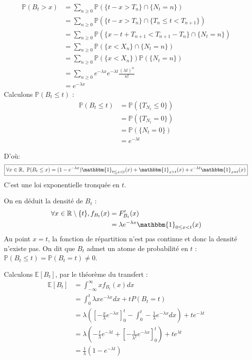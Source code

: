 \documentclass[a4paper, titlepage]{livret} %
\begin{document}
			\[\begin{aligned}
				\mathbb{P}(B_{t} > x) & = \sum_{n \geq 0} \mathbb{P}(\{t - x > T_{n}\} \cap \{N_{t} = n\})\\
									  & = \sum_{n \geq 0} \mathbb{P}(\{t - x > T_{n}\} \cap \{T_{n} \leq t < T_{n+1}\})\\
									  & = \sum_{n \geq 0} \mathbb{P}(\{x - t + T_{n+1} < T_{n+1} - T_{n}\} \cap \{N_{t} = n\})\\
									  & = \sum_{n \geq 0} \mathbb{P}(\{x < X_{n}\} \cap \{N_{t} = n\})\\
									  & = \sum_{n \geq 0} \mathbb{P}(\{x < X_{n}\}) \mathbb{P}(\{N_{t} = n\})\\
									  & = \sum_{n \geq 0} e^{-\lambda x}e^{-\lambda t}\frac{(\lambda t)^{n}}{n!}\\
									  & = e^{-\lambda x}
			\end{aligned}\]
			Calculons $\mathbb{P}(B_{t} \leq t)$ :
			\[\begin{aligned}
				\mathbb{P}(B_{t} \leq t) & = \mathbb{P}(\{T_{N_{t}} \leq 0\})\\
										 & = \mathbb{P}(\{T_{N_{t}} = 0\})\\
									     & = \mathbb{P}(\{N_{t} = 0\})\\
									     & = e^{-\lambda t}
			\end{aligned}\]

			D'où:
			\[\boxed{
				\forall x \in \mathbb{R}, \ \mathbb{P}(B_{t} \leq x) = (1 - e^{-\lambda x})\mathbbm{1}_{0 \leq x < t}(x) + \mathbbm{1}_{x > t}(x) + e^{-\lambda t}\mathbbm{1}_{x = t}(x)
			}\]
			C'est une loi exponentielle tronquée en $t$.

			On en déduit la densité de $B_{t}$ :
			\[\begin{aligned}
				\forall x \in \mathbb{R}\setminus \{t\}, f_{B_{t}}(x) & = F_{B_{t}}'(x)\\
													                  & = \lambda e^{-\lambda x}\mathbbm{1}_{0 \leq x < t}(x)
			\end{aligned}\]
			Au point $x = t$, la fonction de répartition n'est pas continue et donc la densité n'existe pas.
			On dit que $B_{t}$ admet un atome de probabilité en $t$ : $\mathbb{P}(B_{t} \leq t) = \mathbb{P}(B_{t} = t) \neq 0$.

			Calculons $\mathbb{E}[B_{t}]$, par le théorème du transfert :
			\[\begin{aligned}
				\mathbb{E}[B_{t}] & = \int_{-\infty}^{\infty} xf_{B_{t}}(x)dx\\
								  & = \int_{0}^{t} \lambda x e^{-\lambda x}dx + tP(B_{t} = t)\\
								  & = \lambda \left(\left[ -\frac{x}{\lambda} e^{-\lambda x}\right]_{0}^{t} - 
   										\int_{0}^{t} -\frac{1}{\lambda} e^{-\lambda x} dx\right) + te^{-\lambda t}\\
                                  & = \lambda \left(-\frac{t}{\lambda}e^{-\lambda t} + \left[-\frac{1}{\lambda^{2}} e^{-\lambda x}\right]_{0}^{t}\right) + te^{\lambda t} \\
                                  & = \frac{1}{\lambda}(1 - e^{-\lambda t}) \\
			\end{aligned}\]
\end{document}
